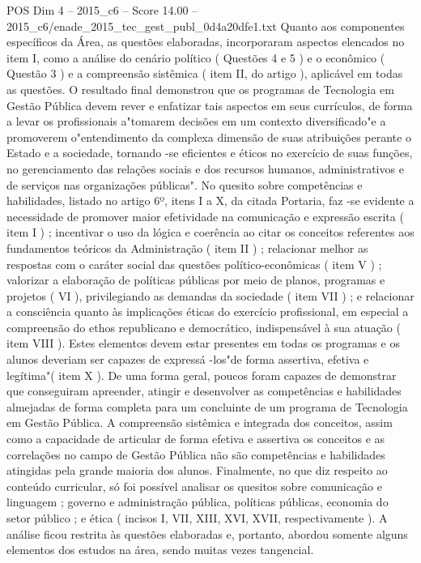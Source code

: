 \begin{textsample}{POS Dim 4 – 2015\_c6 – Score 14.00 – 2015\_c6/enade\_2015\_tec\_gest\_publ\_0d4a20dfe1.txt}
Quanto aos componentes específicos da Área, as questões elaboradas, incorporaram aspectos elencados no item I, como a análise do cenário político ( Questões 4 e 5 ) e o econômico ( Questão 3 ) e a compreensão sistêmica ( item II, do artigo ), aplicável em todas as questões.
O resultado final demonstrou que os programas de Tecnologia em Gestão Pública devem rever e enfatizar tais aspectos em seus currículos, de forma a levar os profissionais a"tomarem decisões em um contexto diversificado"e a promoverem o"entendimento da complexa dimensão de suas atribuições perante o Estado e a sociedade, tornando -se eficientes e éticos no exercício de suas funções, no gerenciamento das relações sociais e dos recursos humanos, administrativos e de serviços nas organizações públicas".
No quesito sobre competências e habilidades, listado no artigo 6º, itens I a X, da citada Portaria, faz -se evidente a necessidade de promover maior efetividade na comunicação e expressão escrita ( item I ) ; incentivar o uso da lógica e coerência ao citar os conceitos referentes aos fundamentos teóricos da Administração ( item II ) ; relacionar melhor as respostas com o caráter social das questões político-econômicas ( item V ) ; valorizar a elaboração de políticas públicas por meio de planos, programas e projetos ( VI ), privilegiando as demandas da sociedade ( item VII ) ; e relacionar a consciência quanto às implicações éticas do exercício profissional, em especial a compreensão do ethos republicano e democrático, indispensável à sua atuação ( item VIII ).
Estes elementos devem estar presentes em todas os programas e os alunos deveriam ser capazes de expressá -los"de forma assertiva, efetiva e legítima"( item X ).
De uma forma geral, poucos foram capazes de demonstrar que conseguiram apreender, atingir e desenvolver as competências e habilidades almejadas de forma completa para um concluinte de um programa de Tecnologia em Gestão Pública.
A compreensão sistêmica e integrada dos conceitos, assim como a capacidade de articular de forma efetiva e assertiva os conceitos e as correlações no campo de Gestão Pública não são competências e habilidades atingidas pela grande maioria dos alunos.
Finalmente, no que diz respeito ao conteúdo curricular, só foi possível analisar os quesitos sobre comunicação e linguagem ; governo e administração pública, políticas públicas, economia do setor público ; e ética ( incisos I, VII, XIII, XVI, XVII, respectivamente ).
A análise ficou restrita às questões elaboradas e, portanto, abordou somente alguns elementos dos estudos na área, sendo muitas vezes tangencial.

\end{textsample}
